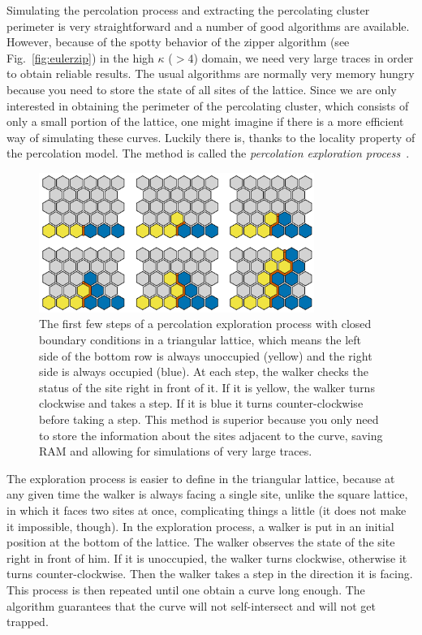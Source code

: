 Simulating the percolation process and extracting the percolating cluster
perimeter is very straightforward and a number of good algorithms are
available. However, because of the spotty behavior of the zipper algorithm (see
Fig.~\ref{fig:eulerzip}) in the high $\kappa$ ($>4$) domain, we need very large
traces in order to obtain reliable results. The usual algorithms are normally
very memory hungry because you need to store the state of all sites of the
lattice. Since we are only interested in obtaining the perimeter of the
percolating cluster, which consists of only a small portion of the lattice, one
might imagine if there is a more efficient way of simulating these curves.
Luckily there is, thanks to the locality property of the percolation model. The
method is called the \textit{percolation exploration process}~\cite{Cardy2005}.

\begin{figure}[b]
\begin{center}
    \includegraphics[width=0.8\textwidth]{chapters/ch6-asle/figs/explore}
\end{center}
\caption{The first few steps of a percolation exploration process with closed
    boundary conditions in a triangular lattice, which means the left side of
    the bottom row is always unoccupied (yellow) and the right side is always
    occupied (blue). At each step, the walker checks the status of the site
    right in front of it. If it is yellow, the walker turns clockwise and takes
    a step. If it is blue it turns counter-clockwise before taking a step. This
    method is superior because you only need to store the information about the
    sites adjacent to the curve, saving RAM and allowing for simulations of
    very large traces.}
\label{fig:explore}
\end{figure}


The exploration process is easier to define in the triangular lattice, because
at any given time the walker is always facing a single site, unlike the square
lattice, in which it faces two sites at once, complicating things a little (it
does not make it impossible, though). In the exploration process, a walker is
put in an initial position at the bottom of the lattice. The walker observes
the state of the site right in front of him. If it is unoccupied, the walker
turns clockwise, otherwise it turns counter-clockwise. Then the walker takes a
step in the direction it is facing. This process is then repeated until one
obtain a curve long enough. The algorithm guarantees that the curve will not
self-intersect and will not get trapped.


